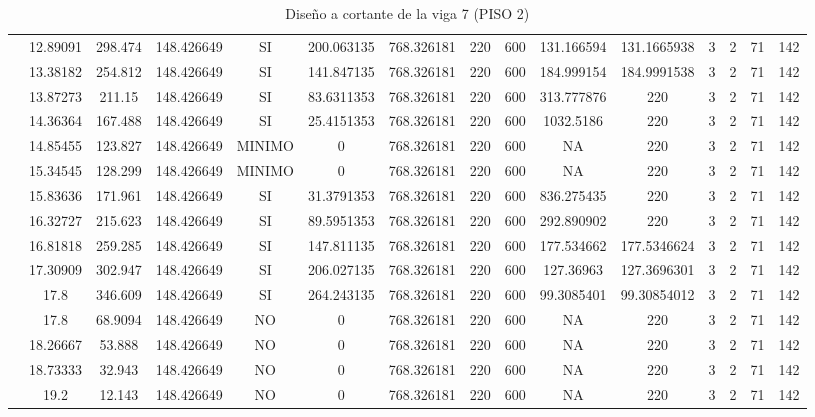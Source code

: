 \begin{table}[H]
{\begin{tabular}{|c|c|c|c|c|c|c|c|c|c|c|c|c|c|c|}
\cline{2-15}    & 12.89091 & 298.474 & 148.426649 & SI  & 200.063135 & 768.326181 & 220 & 600 & 131.166594 & 131.1665938 & 3   & 2   & 71  & 142 \bigstrut\\
\cline{2-15}    & 13.38182 & 254.812 & 148.426649 & SI  & 141.847135 & 768.326181 & 220 & 600 & 184.999154 & 184.9991538 & 3   & 2   & 71  & 142 \bigstrut\\
\cline{2-15}    & 13.87273 & 211.15 & 148.426649 & SI  & 83.6311353 & 768.326181 & 220 & 600 & 313.777876 & 220 & 3   & 2   & 71  & 142 \bigstrut\\
\cline{2-15}    & 14.36364 & 167.488 & 148.426649 & SI  & 25.4151353 & 768.326181 & 220 & 600 & 1032.5186 & 220 & 3   & 2   & 71  & 142 \bigstrut\\
\cline{2-15}    & 14.85455 & 123.827 & 148.426649 & MINIMO & 0   & 768.326181 & 220 & 600 & NA  & 220 & 3   & 2   & 71  & 142 \bigstrut\\
\cline{2-15}    & 15.34545 & 128.299 & 148.426649 & MINIMO & 0   & 768.326181 & 220 & 600 & NA  & 220 & 3   & 2   & 71  & 142 \bigstrut\\
\cline{2-15}    & 15.83636 & 171.961 & 148.426649 & SI  & 31.3791353 & 768.326181 & 220 & 600 & 836.275435 & 220 & 3   & 2   & 71  & 142 \bigstrut\\
\cline{2-15}    & 16.32727 & 215.623 & 148.426649 & SI  & 89.5951353 & 768.326181 & 220 & 600 & 292.890902 & 220 & 3   & 2   & 71  & 142 \bigstrut\\
\cline{2-15}    & 16.81818 & 259.285 & 148.426649 & SI  & 147.811135 & 768.326181 & 220 & 600 & 177.534662 & 177.5346624 & 3   & 2   & 71  & 142 \bigstrut\\
\cline{2-15}    & 17.30909 & 302.947 & 148.426649 & SI  & 206.027135 & 768.326181 & 220 & 600 & 127.36963 & 127.3696301 & 3   & 2   & 71  & 142 \bigstrut\\
\cline{2-15}    & 17.8 & 346.609 & 148.426649 & SI  & 264.243135 & 768.326181 & 220 & 600 & 99.3085401 & 99.30854012 & 3   & 2   & 71  & 142 \bigstrut\\
\cline{2-15}    & 17.8 & 68.9094 & 148.426649 & NO  & 0   & 768.326181 & 220 & 600 & NA  & 220 & 3   & 2   & 71  & 142 \bigstrut\\
\cline{2-15}    & 18.26667 & 53.888 & 148.426649 & NO  & 0   & 768.326181 & 220 & 600 & NA  & 220 & 3   & 2   & 71  & 142 \bigstrut\\
\cline{2-15}    & 18.73333 & 32.943 & 148.426649 & NO  & 0   & 768.326181 & 220 & 600 & NA  & 220 & 3   & 2   & 71  & 142 \bigstrut\\
\cline{2-15}    & 19.2 & 12.143 & 148.426649 & NO  & 0   & 768.326181 & 220 & 600 & NA  & 220 & 3   & 2   & 71  & 142 \bigstrut\\
\hline
\end{tabular}%

  }%
    \caption{Diseño a cortante de la viga 7 (PISO 2) }
  \label{tab:C VG7 P2 }%
\end{table}%
